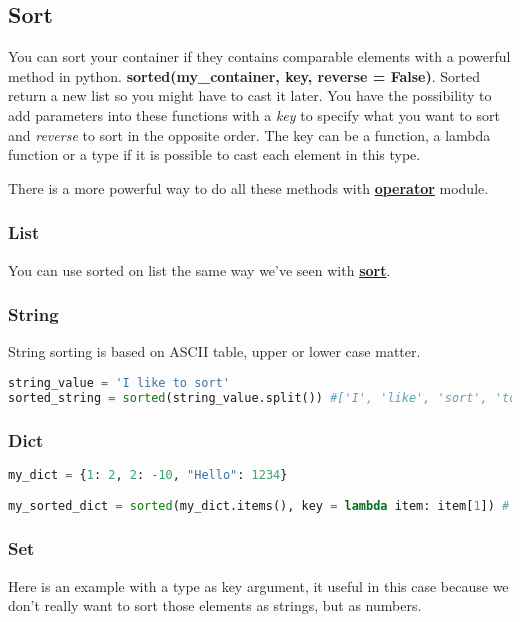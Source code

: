 \documentclass[a4paper, 12pt, titlepage]{scrartcl} %
\begin{document}
\subsection{Sort}
You can sort your container if they contains comparable elements with a powerful method in python. \textbf{sorted(my\_container, key, reverse = False)}. Sorted return a new list so you might have to cast it later. You have the possibility to add parameters into these functions with a \textit{key} to specify what you want to sort and \textit{reverse} to sort in the opposite order. The key can be a function, a lambda function or a type if it is possible to cast each element in this type.

\vspace{5mm}

There is a more powerful way to do all these methods with \hyperref[subsec:Operator]{\textbf{operator}} module.

\subsubsection{List}
You can use sorted on list the same way we've seen with \hyperref[Sort]{\textbf{sort}}.

\subsubsection{String}
String sorting is based on ASCII table, upper or lower case matter.

\begin{lstlisting}[language=Python]
string_value = 'I like to sort'
sorted_string = sorted(string_value.split()) #['I', 'like', 'sort', 'to'] #split() allows to not consider white spaces
\end{lstlisting} \vspace{5mm}

\subsubsection{Dict}
\begin{lstlisting}[language=Python]
my_dict = {1: 2, 2: -10, "Hello": 1234}

my_sorted_dict = sorted(my_dict.items(), key = lambda item: item[1]) # [(2,-10),(1,2),("hello",1234)]
\end{lstlisting} \vspace{5mm}

\subsubsection{Set}
Here is an example with a type as key argument, it useful in this case because we don't really want to sort those elements as strings, but as numbers.
\end{document}
